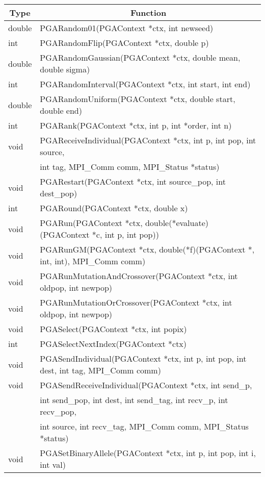 \documentclass{report}
\begin{document}
\begin{tabular}{|l|l|} \hline\hline
\multicolumn{1}{|c|}{Type} &
\multicolumn{1}{c|}{Function}  \\  \hline\hline
double &  PGARandom01(PGAContext *ctx, int newseed) \\ \hline
int &  PGARandomFlip(PGAContext *ctx, double p) \\ \hline
double &  PGARandomGaussian(PGAContext *ctx, double mean, double sigma) \\ \hline
int &  PGARandomInterval(PGAContext *ctx, int start, int end) \\ \hline
double &  PGARandomUniform(PGAContext *ctx, double start, double end) \\ \hline
int &  PGARank(PGAContext *ctx, int p, int *order, int n) \\ \hline
void &  PGAReceiveIndividual(PGAContext *ctx, int p, int pop, int source, \\
     &  int tag, MPI\_Comm comm, MPI\_Status *status) \\ \hline
void &  PGARestart(PGAContext *ctx, int source\_pop, int dest\_pop) \\ \hline
int &  PGARound(PGAContext *ctx, double x) \\ \hline
void &  PGARun(PGAContext *ctx, double(*evaluate)(PGAContext *c, int p, int
pop)) \\ \hline
void &  PGARunGM(PGAContext *ctx, double(*f)(PGAContext *, int, int), MPI\_Comm
comm) \\ \hline
void &  PGARunMutationAndCrossover(PGAContext *ctx, int oldpop, int newpop) \\
\hline
void &  PGARunMutationOrCrossover(PGAContext *ctx, int oldpop, int newpop) \\ \hline
void &  PGASelect(PGAContext *ctx, int popix) \\ \hline
int &  PGASelectNextIndex(PGAContext *ctx) \\ \hline
void &  PGASendIndividual(PGAContext *ctx, int p, int pop, int dest, int tag,
MPI\_Comm comm) \\ \hline
void &  PGASendReceiveIndividual(PGAContext *ctx, int send\_p, \\
     &  int send\_pop, int dest, int send\_tag, int recv\_p, int recv\_pop, \\
     &  int source, int recv\_tag, MPI\_Comm comm, MPI\_Status *status) \\ \hline
void &  PGASetBinaryAllele(PGAContext *ctx, int p, int pop, int i, int val) \\

\end{tabular}
\end{document}

